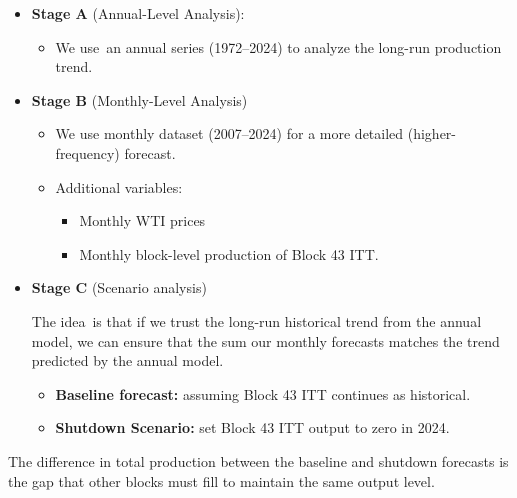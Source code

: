 \documentclass[
]{article}
\providecommand{\tightlist}{%
  \setlength{\itemsep}{0pt}\setlength{\parskip}{0pt}}
\begin{document}
\begin{itemize}
\item
  \textbf{Stage A} (Annual-Level Analysis):\hspace{0pt}

  \begin{itemize}
  \tightlist
  \item
    We use~an annual series (1972--2024) to analyze the long-run
    production trend.
  \end{itemize}
\item
  \textbf{Stage B} (Monthly-Level Analysis)\hspace{0pt}

  \begin{itemize}
  \item
    We use monthly dataset (2007--2024) for a more detailed
    (higher-frequency) forecast.\hspace{0pt}
  \item
    Additional variables:\hspace{0pt}

    \begin{itemize}
    \item
      Monthly WTI prices\hspace{0pt}
    \item
      Monthly block-level production of Block 43 ITT.
    \end{itemize}
  \end{itemize}
\item
  \textbf{Stage C} (Scenario analysis)\hspace{0pt}

  The idea~is that if we trust the long-run historical trend from the
  annual model, we can ensure that the sum our monthly forecasts matches
  the trend predicted by the annual model. \hspace{0pt}

  \begin{itemize}
  \item
    \textbf{Baseline forecast:} assuming Block 43 ITT continues as
    historical.\hspace{0pt}
  \item
    \textbf{Shutdown Scenario:} set Block 43 ITT output to zero in
    2024.\hspace{0pt}
  \end{itemize}
\end{itemize}

The difference in total production between the baseline and shutdown
forecasts is the gap that other blocks must fill to maintain the same
output level.\hspace{0pt}
\end{document}
